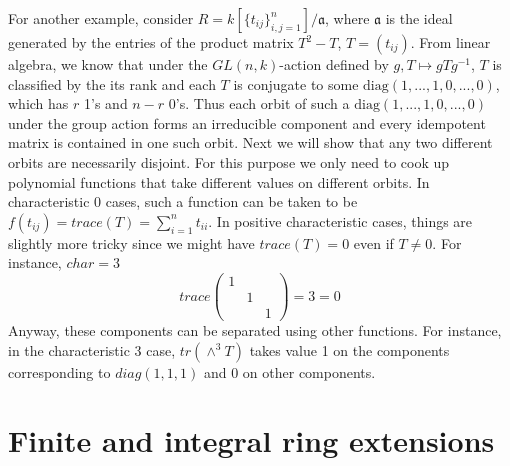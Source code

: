 \begin{example}
\label{example-idempotent-matrices}
For another example, consider
$R=k[\{t_{ij}\}_{i,j=1}^{n}]/\mathfrak a$, where $\mathfrak a$ is
the ideal generated by the entries of the product matrix $T^2-T$,
$T=(t_{ij})$. From linear algebra, we know that under the
$GL(n,k)$-action defined by $g,T \mapsto gTg^{-1}$, $T$ is
classified by the its rank and each $T$ is conjugate to some
$\text{diag}(1,...,1,0,...,0)$, which has $r$ 1's and $n-r$ 0's.
Thus each orbit of such a $\text{diag}(1,...,1,0,...,0)$ under the
group action forms an irreducible component and every idempotent
matrix is contained in one such orbit. Next we will show that any
two different orbits are necessarily disjoint. For this purpose we
only need to cook up polynomial functions that take different
values on different orbits. In characteristic 0 cases, such a
function can be taken to be
$f(t_{ij})=trace(T)=\sum_{i=1}^nt_{ii}$. In positive
characteristic cases, things are slightly more tricky since we
might have $trace(T)=0$ even if $T \neq 0$. For instance, $char=3$
$$trace\left(\begin{matrix}
1 & &\\
& 1 &\\
& & 1
\end{matrix}\right)=3=0$$
Anyway, these components can be separated using other functions.
For instance, in the characteristic 3 case, $tr(\wedge^3T)$ takes
value 1 on the components corresponding to $diag(1,1,1)$ and 0 on
other components.
\end{example}





































\section{Finite and integral ring extensions}
\label{section-finite-ring-extensions}

